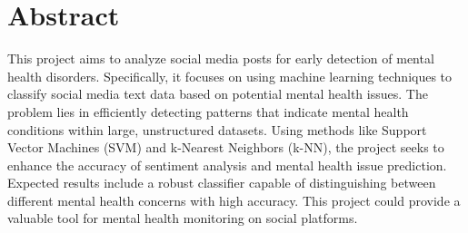 

\section*{Abstract} 




\noindent
This project aims to analyze social media posts for early detection of mental health disorders. Specifically, it focuses on using machine learning techniques to classify social media text data based on potential mental health issues. The problem lies in efficiently detecting patterns that indicate mental health conditions within large, unstructured datasets. Using methods like Support Vector Machines (SVM) and k-Nearest Neighbors (k-NN), the project seeks to enhance the accuracy of sentiment analysis and mental health issue prediction. Expected results include a robust classifier capable of distinguishing between different mental health concerns with high accuracy. This project could provide a valuable tool for mental health monitoring on social platforms.

